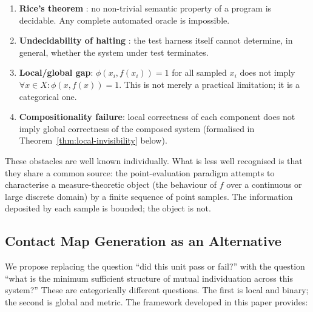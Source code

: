 \documentclass[12pt,a4paper,twocolumn]{article}
\theoremstyle{plain}
\theoremstyle{definition}
\theoremstyle{remark}
\begin{document}
\begin{enumerate}[label=(\roman*)]
\item \textbf{Rice's theorem} \citep{rice1953classes}: no non-trivial semantic
  property of a program is decidable.  Any complete automated oracle is
  impossible.

\item \textbf{Undecidability of halting} \citep{turing1936computable}: the
  test harness itself cannot determine, in general, whether the system under
  test terminates.

\item \textbf{Local/global gap}: $\phi(x_i, f(x_i)) = 1$ for all sampled
  $x_i$ does not imply $\forall x \in X\!: \phi(x,f(x)) = 1$.  This is not
  merely a practical limitation; it is a categorical one.

\item \textbf{Compositionality failure}: local correctness of each component
  does not imply global correctness of the composed system (formalised in
  Theorem~\ref{thm:local-invisibility} below).
\end{enumerate}

These obstacles are well known individually.  What is less well recognised is
that they share a common source: the point-evaluation paradigm attempts to
characterise a measure-theoretic object (the behaviour of $f$ over a
continuous or large discrete domain) by a finite sequence of point samples.
The information deposited by each sample is bounded; the object is not.

\subsection{Contact Map Generation as an Alternative}

We propose replacing the question ``did this unit pass or fail?'' with the
question ``what is the minimum sufficient structure of mutual individuation
across this system?''  These are categorically different questions.  The
first is local and binary; the second is global and metric.  The framework
developed in this paper provides:
\end{document}
